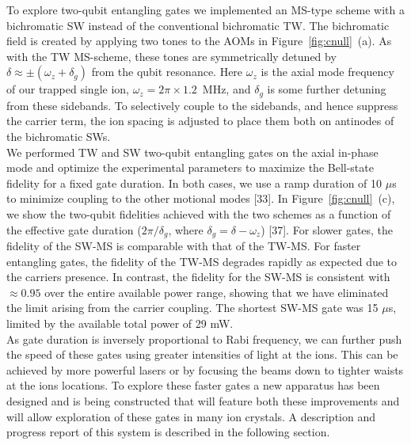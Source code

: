 \documentclass[12pt]{iopart}
\begin{document}
    To explore two-qubit entangling gates we implemented an MS-type scheme
    with a bichromatic SW instead of the conventional
    bichromatic TW. The bichromatic field is created by applying two
    tones to the AOMs in Figure~\ref{fig:cnull}~(a). As with the TW MS-scheme, these
    tones are symmetrically detuned by $\delta \approx \pm(\omega_z + \delta_g) $ from the
    qubit resonance. Here $\omega_z$ 
    is the axial mode frequency of our trapped single ion,
    $\omega_z = 2\pi\times 1.2$~MHz, and $\delta_g$ is some further detuning
    from these sidebands. To selectively couple to the sidebands, and
    hence suppress the carrier term, the ion spacing is adjusted to
    place them both on antinodes of the bichromatic SWs.\\
    We performed TW and SW two-qubit entangling gates on the axial
    in-phase mode and optimize the experimental parameters to maximize
    the Bell-state fidelity for a fixed gate duration. In both cases,
    we use a ramp duration of 10 $\mu$s to minimize coupling to the other
    motional modes [33]. In Figure~\ref{fig:cnull}~(c), we show the two-qubit fidelities
    achieved with the two schemes as a function of the effective gate
    duration ($2\pi/\delta_g$, where $\delta_g = \delta - \omega_z$) [37]. For slower gates,
    the fidelity of the SW-MS is comparable with that of the
    TW-MS. For faster entangling gates, the fidelity of the TW-MS
    degrades rapidly as expected due to the carriers presence. In contrast, the fidelity for the SW-MS is
    consistent with $\approx 0.95$ over the entire available power range,
    showing that we have eliminated the limit arising from the carrier
    coupling. The shortest SW-MS gate was 15 $\mu$s, limited by the
    available total power of 29 mW. \\

    As gate duration is inversely proportional to Rabi frequency, we
    can further push the speed of these gates using greater
    intensities of light at the ions. This can be achieved by more
    powerful lasers or by focusing the beams down to tighter waists at
    the ions locations. To explore these faster gates a new apparatus
    has been designed and is being constructed that will feature both
    these improvements and will allow exploration of these gates in
    many ion crystals. A description and progress report of this
    system is described in the following section.\\
\end{document}
